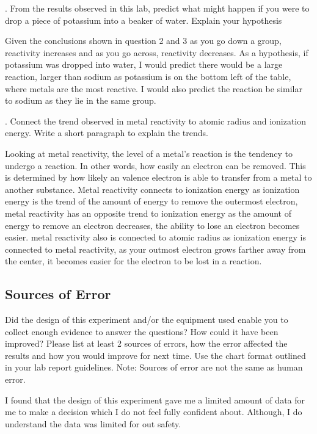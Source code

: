 \documentclass[12pt]{article}
\begin{document}
    \bigskip
    . From the results observed in this lab, predict what might happen if you were to drop a piece of potassium into a beaker of water. Explain your hypothesis

    Given the conclusions shown in question 2 and 3 as you go down a group, reactivity increases and as you go across, reactivity decreases. As a hypothesis, if potassium was dropped into water, I would predict there would be a large reaction, larger than sodium as potassium is on the bottom left of the table, where metals are the most reactive. I would also predict the reaction be similar to sodium as they lie in the same group. 

    \bigskip
    . Connect the trend observed in metal reactivity to atomic radius and ionization energy. Write a short paragraph to explain the trends.

    Looking at metal reactivity, the level of a metal's reaction is the tendency to undergo a reaction. In other words, how easily an electron can be removed. This is determined by how likely an valence electron is able to transfer from a metal to another substance. Metal reactivity connects to ionization energy as ionization energy is the trend of the amount of energy to remove the outermost electron, metal reactivity has an opposite trend to ionization energy as the amount of energy to remove an electron decreases, the ability to lose an electron becomes easier. metal reactivity also is connected to atomic radius as ionization energy is connected to metal reactivity, as your outmost electron grows farther away from the center, it becomes easier for the electron to be lost in a reaction.

    \subsection*{Sources of Error}
    Did the design of this experiment and/or the equipment used enable you to collect enough evidence to answer the questions? How could it have been improved? Please list at least 2 sources of errors, how the error affected the results and how you would improve for next time. Use the chart format outlined in your lab report guidelines. Note: Sources of error are not the same as human error.

    I found that the design of this experiment gave me a limited amount of data for me to make a decision which I do not feel fully confident about. Although, I do understand the data was limited for out safety.
    
\end{document}
